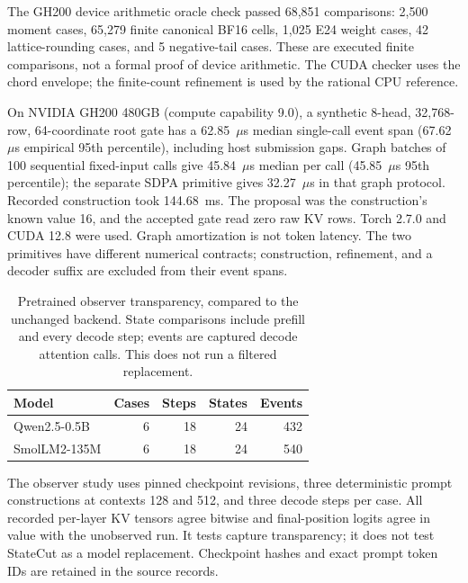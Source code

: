 The GH200 device arithmetic oracle check passed 68,851 comparisons: 2,500 moment cases, 65,279 finite canonical BF16 cells, 1,025 E24 weight cases, 42 lattice-rounding cases, and 5 negative-tail cases. These are executed finite comparisons, not a formal proof of device arithmetic. The CUDA checker uses the chord envelope; the finite-count refinement is used by the rational CPU reference.

On NVIDIA GH200 480GB (compute capability 9.0), a synthetic 8-head, 32,768-row, 64-coordinate root gate has a 62.85~$\mu$s median single-call event span (67.62~$\mu$s empirical 95th percentile), including host submission gaps. Graph batches of 100 sequential fixed-input calls give 45.84~$\mu$s median per call (45.85~$\mu$s 95th percentile); the separate SDPA primitive gives 32.27~$\mu$s in that graph protocol. Recorded construction took 144.68~ms. The proposal was the construction's known value 16, and the accepted gate read zero raw KV rows. Torch 2.7.0 and CUDA 12.8 were used. Graph amortization is not token latency. The two primitives have different numerical contracts; construction, refinement, and a decoder suffix are excluded from their event spans.

\begin{table}[t]
\centering
\small
\caption{Pretrained observer transparency, compared to the unchanged backend. State comparisons include prefill and every decode step; events are captured decode attention calls. This does not run a filtered replacement.}
\label{tab:pretrained}
\begin{tabular}{lrrrr}
\toprule
Model & Cases & Steps & States & Events \\
\midrule
Qwen2.5-0.5B & 6 & 18 & 24 & 432 \\
SmolLM2-135M & 6 & 18 & 24 & 540 \\
\bottomrule
\end{tabular}
\end{table}

The observer study uses pinned checkpoint revisions, three deterministic prompt constructions at contexts 128 and 512, and three decode steps per case. All recorded per-layer KV tensors agree bitwise and final-position logits agree in value with the unobserved run. It tests capture transparency; it does not test StateCut as a model replacement. Checkpoint hashes and exact prompt token IDs are retained in the source records.
